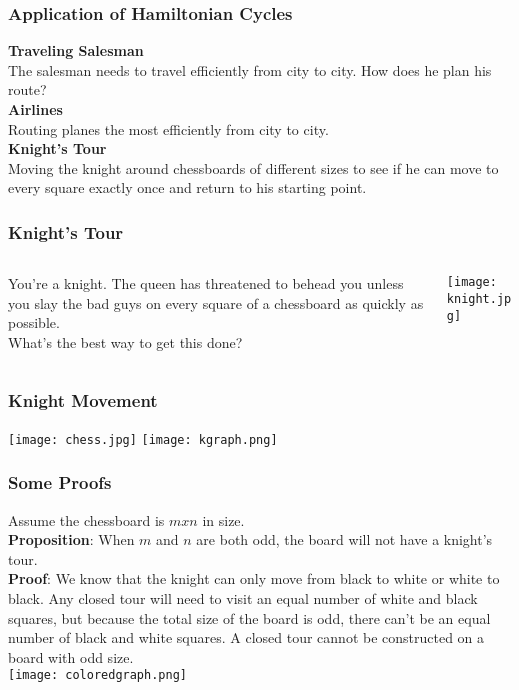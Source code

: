 \documentclass{beamer}
\begin{document}
\begin{frame}
\frametitle{Application of Hamiltonian Cycles}
\textbf{Traveling Salesman} \\
The salesman needs to travel efficiently from city to city.  How does he plan his route? \\
\pause
\vspace{3mm}
\textbf{Airlines} \\
Routing planes the most efficiently from city to city. \\
\pause
\vspace{3mm}
\textbf{Knight's Tour} \\
Moving the knight around chessboards of different sizes to see if he can move to every square exactly once and return to his starting point.
\end{frame}

\begin{frame}
\frametitle{Knight's Tour}
\begin{columns}[T]
\begin{column}[T]{5cm}
\vspace{5mm}
You're a knight.  The queen has threatened to behead you unless you slay the bad guys on every square of a chessboard as quickly as possible. \\
\vspace{3mm}
What's the best way to get this done?
\end{column}
\begin{column}[T]{5cm}
\texttt{[image: knight.jpg]} \\
\end{column}
\end{columns}
\end{frame}


\begin{frame}
\frametitle{Knight Movement}
\hspace{2mm}
\texttt{[image: chess.jpg]} 
\pause
\hspace{7mm}
\texttt{[image: kgraph.png]} \\
\end{frame}

\begin{frame}
\frametitle{Some Proofs}
Assume the chessboard is $m x n$ in size. \\  %
\vspace{2mm}
\textbf{Proposition}: When $m$ and $n$ are both odd, the board will not have a knight's tour. \\
\textbf{Proof}:  We know that the knight can only move from black to white or white to black.  Any closed tour will need to visit an equal number of white and black squares, but because the total size of the board is odd, there can't be an equal number of black and white squares.  A closed tour cannot be constructed on a board with odd size. \\
\vspace{2mm}
\hspace{13mm}
\texttt{[image: coloredgraph.png]}
\end{frame}
\end{document}
